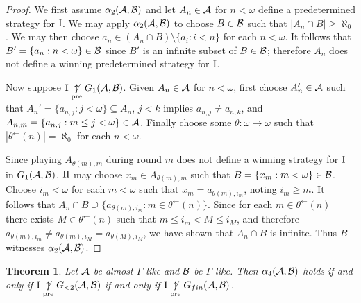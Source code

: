 \documentclass{amsart}
\theoremstyle{plain}
\newtheorem{theorem}{Theorem}
\theoremstyle{definition}
\theoremstyle{remark}
\theoremstyle{plain}
\theoremstyle{definition}
\theoremstyle{remark}
\begin{document}
\begin{proof}
We first assume \(\alpha_2(\mathcal{A},\mathcal{B})\) and let \(A_n\in\mathcal{A}\) for \(n<\omega\)
define a predetermined strategy for \(\mathrm{I}\).
We may apply \(\alpha_2(\mathcal{A},\mathcal{B})\) to choose \(B\in\mathcal{B}\) such that
\(|A_n\cap B|\geq\aleph_0\). We may then choose \(a_n\in(A_n\cap B)\setminus\{a_i:i<n\}\)
for each \(n<\omega\). It follows that \(B'=\{a_n:n<\omega\}\in\mathcal{B}\) since
\(B'\) is an infinite subset of \(B\in\mathcal{B}\); therefore \(A_n\) does not define
a winning predetermined strategy for \(\mathrm{I}\).

Now suppose \(\mathrm{I}\underset{\text{pre}}{\not\uparrow} G_1(\mathcal{A},\mathcal{B})\). Given \(A_n\in\mathcal{A}\) for \(n<\omega\),
first choose \(A_n'\in\mathcal{A}\) such that \(A_n'=\{a_{n,j}:j<\omega\}\subseteq A_n\),
\(j<k\) implies \(a_{n,j}\not=a_{n,k}\),
and \(A_{n,m}=\{a_{n,j}:m\leq j<\omega\}\in\mathcal{A}\).
Finally choose
some \(\theta:\omega\to\omega\) such that \(|\theta^{\leftarrow}(n)|=\aleph_0\) for
each \(n<\omega\).

Since playing \(A_{\theta(m),m}\) during round \(m\)
does not define a winning strategy for \(\mathrm{I}\) in
\(G_1(\mathcal{A},\mathcal{B})\), \(\mathrm{II}\) may choose \(x_m\in A_{\theta(m),m}\)
such that \(B=\{x_m:m<\omega\}\in\mathcal{B}\).
Choose \(i_m<\omega\) for each \(m<\omega\) such that
\(x_m=a_{\theta(m),i_m}\), noting \(i_m\geq m\).
It follows that 
\(A_n\cap B\supseteq\{a_{\theta(m),i_m}:m\in\theta^{\leftarrow}(n)\}\).
Since for each \(m\in\theta^{\leftarrow}(n)\) there exists
\(M\in\theta^{\leftarrow}(n)\) such that \(m\leq i_m<M\leq i_{M}\),
and therefore \(a_{\theta(m),i_m}\not=a_{\theta(m),i_{M}}=a_{\theta(M),i_{M}}\),
we have shown that \(A_n\cap B\) is infinite. Thus \(B\) witnesses
\(\alpha_2(\mathcal{A},\mathcal{B})\).
\end{proof}

\begin{theorem}
Let \(\mathcal{A}\) be almost-\(\Gamma\)-like and \(\mathcal{B}\) be \(\Gamma\)-like. 
Then \(\alpha_4(\mathcal{A},\mathcal{B})\) holds if and only
if \(\mathrm{I}\underset{\text{pre}}{\not\uparrow} G_{<2}(\mathcal{A},\mathcal{B})\) if and only if
\(\mathrm{I}\underset{\text{pre}}{\not\uparrow} G_{fin}(\mathcal{A},\mathcal{B})\).
\end{theorem}
\end{document}
